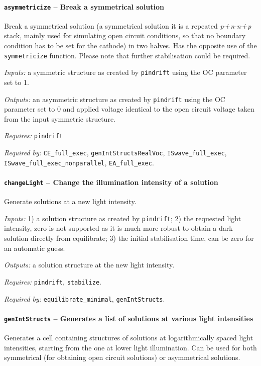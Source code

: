 		\paragraph{\texttt{asymmetricize} -- Break a symmetrical solution}\label{asymmetricize}
		Break a symmetrical solution (a symmetrical solution it is a repeated \textit{p}-\textit{i}-\textit{n}-\textit{n}-\textit{i}-\textit{p} stack, mainly used for simulating open circuit conditions, so that no boundary condition has to be set for the cathode) in two halves. Has the opposite use of the \texttt{symmetricize} function.
		Please note that further stabilisation could be required.

		\textit{Inputs:} a symmetric structure as created by \texttt{pin\-drift} using the OC parameter set to 1.

		\textit{Outputs:} an asymmetric structure as created by \texttt{pin\-drift} using the OC
		parameter set to 0 and applied voltage identical to the open circuit
		voltage taken from the input symmetric structure.

		\textit{Requires:} \texttt{pin\-drift}

		\textit{Required by:} \texttt{CE\_full\_exec}, \texttt{gen\-Int\-Structs\-Real\-Voc}, \texttt{IS\-wave\_full\_exec}, \texttt{IS\-wave\_full\_exec\_nonparallel}, \texttt{EA\_full\_exec}.

		\paragraph{\texttt{change\-Light} -- Change the illumination intensity of a solution}
		Generate solutions at a new light intensity.

		\textit{Inputs:} 1) a solution structure as created by \texttt{pin\-drift};
		2) the requested light intensity, zero is not supported as it is
		much more robust to obtain a dark solution directly from equilibrate;
		3) the initial stabilisation time, can be zero for an automatic
		guess.

		\textit{Outputs:} a solution structure at the new light intensity.

		\textit{Requires:} \texttt{pin\-drift}, \texttt{stabilize}.

		\textit{Required by:} \texttt{equilibrate\_minimal}, \texttt{gen\-Int\-Structs}.

		\paragraph{\texttt{gen\-Int\-Structs} -- Generates a list of solutions at various light intensities}\label{genIntStructs}
		Generates a cell containing structures of solutions at logarithmically spaced light intensities, starting from the one at lower light illumination. Can be used for both symmetrical (for obtaining open circuit solutions) or asymmetrical solutions.

